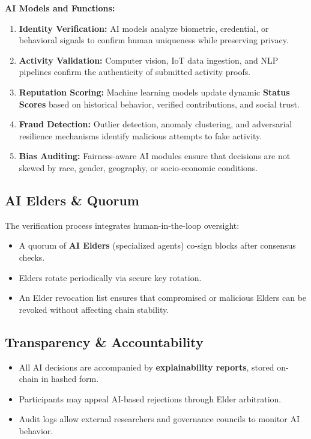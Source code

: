 \documentclass[11pt,a4paper]{article}
\begin{document}
\textbf{AI Models and Functions:}
\begin{enumerate}
    \item \textbf{Identity Verification:} AI models analyze biometric, credential, or behavioral signals to confirm human uniqueness while preserving privacy.
    \item \textbf{Activity Validation:} Computer vision, IoT data ingestion, and NLP pipelines confirm the authenticity of submitted activity proofs.
    \item \textbf{Reputation Scoring:} Machine learning models update dynamic \textbf{Status Scores} based on historical behavior, verified contributions, and social trust.
    \item \textbf{Fraud Detection:} Outlier detection, anomaly clustering, and adversarial resilience mechanisms identify malicious attempts to fake activity.
    \item \textbf{Bias Auditing:} Fairness-aware AI modules ensure that decisions are not skewed by race, gender, geography, or socio-economic conditions.
\end{enumerate}

\subsection{AI Elders \& Quorum}
The verification process integrates human-in-the-loop oversight:
\begin{itemize}
    \item A quorum of \textbf{AI Elders} (specialized agents) co-sign blocks after consensus checks.
    \item Elders rotate periodically via secure key rotation.
    \item An Elder revocation list ensures that compromised or malicious Elders can be revoked without affecting chain stability.
\end{itemize}

\subsection{Transparency \& Accountability}
\begin{itemize}
    \item All AI decisions are accompanied by \textbf{explainability reports}, stored on-chain in hashed form.
    \item Participants may appeal AI-based rejections through Elder arbitration.
    \item Audit logs allow external researchers and governance councils to monitor AI behavior.
\end{itemize}
\end{document}
